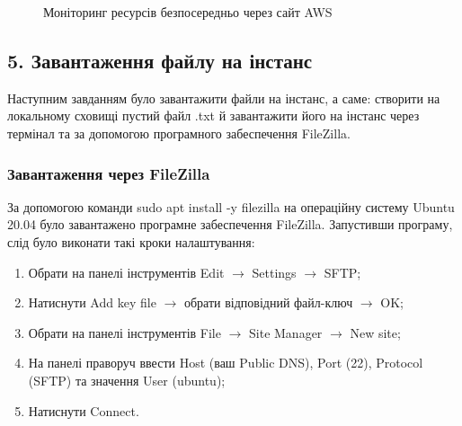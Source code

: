\documentclass[a4paper,14pt]{extarticle}
\begin{document}
\begin{figure}[H]
    \caption{Моніторинг ресурсів безпосередньо через сайт AWS}
    \label{fig:monitoring}
\end{figure}

\subsection*{5. Завантаження файлу на інстанс}
\label{section:5}

Наступним завданням було завантажити файли на інстанс, а саме:
створити на локальному сховищі пустий файл {\ttfamily *.txt} й завантажити 
його на інстанс через термінал та за допомогою програмного забеспечення FileZilla.

\subsubsection*{Завантаження через FileZilla}

За допомогою команди {\ttfamily sudo apt install -y filezilla} на операційну 
систему Ubuntu 20.04 було завантажено програмне забеспечення FileZilla. 
Запустивши програму, слід було виконати такі кроки налаштування:

\begin{enumerate}
    \item Обрати на панелі інструментів Edit $\rightarrow$ Settings $\rightarrow$ SFTP;
    \item Натиснути Add key file $\rightarrow$ обрати відповідний файл-ключ $\rightarrow$ OK;
    \item Обрати на панелі інструментів File $\rightarrow$ Site Manager $\rightarrow$ New site;
    \item На панелі праворуч ввести Host (ваш Public DNS), Port (22), Protocol (SFTP) та значення User (ubuntu);
    \item Натиснути Connect.
\end{enumerate}
\end{document}
